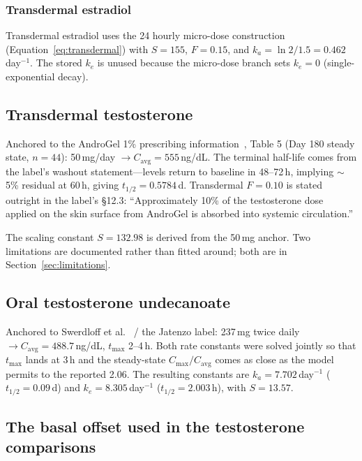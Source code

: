 \documentclass[11pt,a4paper]{article}
\begin{document}
\subsubsection{Transdermal estradiol}

Transdermal estradiol uses the 24 hourly micro-dose construction
(Equation~\ref{eq:transdermal}) with $S = 155$, $F = 0.15$, and $k_a =
\ln 2 / 1.5 = 0.462$\,day$^{-1}$. The stored $k_e$ is unused because the
micro-dose branch sets $k_e = 0$ (single-exponential decay).

\subsection{Transdermal testosterone}
\label{sec:td_t}

Anchored to the AndroGel 1\% prescribing information~\cite{androgel},
Table 5 (Day 180 steady state, $n=44$): 50\,mg/day $\to
C_{\mathrm{avg}} = 555$\,ng/dL. The terminal half-life comes from the
label's washout statement---levels return to baseline in 48--72\,h,
implying $\sim$5\% residual at 60\,h, giving $t_{1/2} = 0.5784$\,d.
Transdermal $F = 0.10$ is stated outright in the label's \S12.3:
``Approximately 10\% of the testosterone dose applied on the skin
surface from AndroGel is absorbed into systemic circulation.''

The scaling constant $S = 132.98$ is derived from the 50\,mg anchor.
Two limitations are documented rather than fitted around; both are in
Section~\ref{sec:limitations}.

\subsection{Oral testosterone undecanoate}
\label{sec:oral_t}

Anchored to Swerdloff et al.~\cite{swerdloff2020} / the Jatenzo label:
237\,mg twice daily $\to C_{\mathrm{avg}} = 488.7$\,ng/dL, $t_{\max}$
2--4\,h. Both rate constants were solved jointly so that $t_{\max}$
lands at 3\,h and the steady-state $C_{\max}/C_{\mathrm{avg}}$ comes as
close as the model permits to the reported 2.06. The resulting constants
are $k_a = 7.702$\,day$^{-1}$ ($t_{1/2} = 0.09$\,d) and $k_e =
8.305$\,day$^{-1}$ ($t_{1/2} = 2.003$\,h), with $S = 13.57$.

\subsection{The basal offset used in the testosterone comparisons}
\label{sec:basal_offset}
\end{document}
